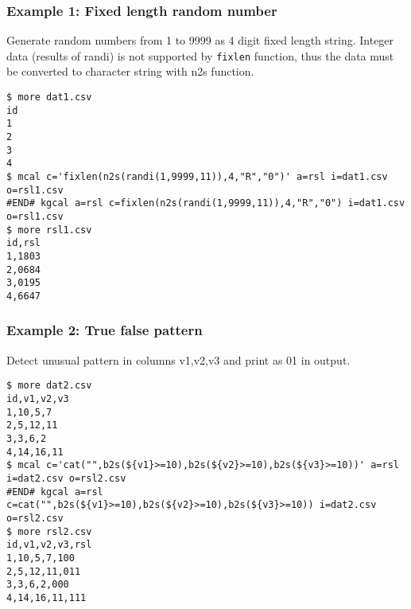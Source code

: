 \subsubsection*{Example 1: Fixed length random number}

Generate random numbers from 1 to 9999 as 4 digit fixed length string.
Integer data (results of randi) is not supported by \verb|fixlen| function, thus the data must be converted to character string with n2s function. 


\begin{Verbatim}[baselinestretch=0.7,frame=single]
$ more dat1.csv
id
1
2
3
4
$ mcal c='fixlen(n2s(randi(1,9999,11)),4,"R","0")' a=rsl i=dat1.csv o=rsl1.csv
#END# kgcal a=rsl c=fixlen(n2s(randi(1,9999,11)),4,"R","0") i=dat1.csv o=rsl1.csv
$ more rsl1.csv
id,rsl
1,1803
2,0684
3,0195
4,6647
\end{Verbatim}
\subsubsection*{Example 2: True false pattern}

Detect unusual pattern in columns v1,v2,v3 and print as 01 in output.


\begin{Verbatim}[baselinestretch=0.7,frame=single]
$ more dat2.csv
id,v1,v2,v3
1,10,5,7
2,5,12,11
3,3,6,2
4,14,16,11
$ mcal c='cat("",b2s(${v1}>=10),b2s(${v2}>=10),b2s(${v3}>=10))' a=rsl i=dat2.csv o=rsl2.csv
#END# kgcal a=rsl c=cat("",b2s(${v1}>=10),b2s(${v2}>=10),b2s(${v3}>=10)) i=dat2.csv o=rsl2.csv
$ more rsl2.csv
id,v1,v2,v3,rsl
1,10,5,7,100
2,5,12,11,011
3,3,6,2,000
4,14,16,11,111
\end{Verbatim}

